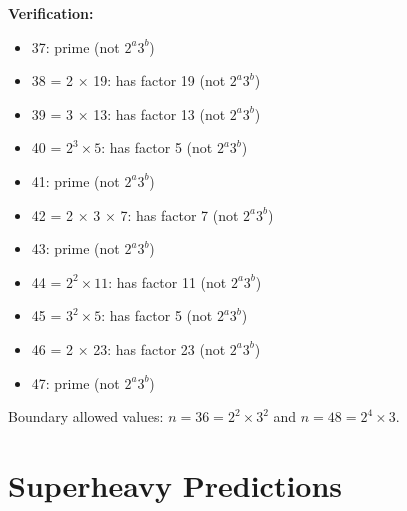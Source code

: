 \textbf{Verification:}
\begin{itemize}
    \item 37: prime (not $2^a 3^b$)
    \item 38 = 2 × 19: has factor 19 (not $2^a 3^b$)
    \item 39 = 3 × 13: has factor 13 (not $2^a 3^b$)
    \item 40 = $2^3 \times 5$: has factor 5 (not $2^a 3^b$)
    \item 41: prime (not $2^a 3^b$)
    \item 42 = 2 × 3 × 7: has factor 7 (not $2^a 3^b$)
    \item 43: prime (not $2^a 3^b$)
    \item 44 = $2^2 \times 11$: has factor 11 (not $2^a 3^b$)
    \item 45 = $3^2 \times 5$: has factor 5 (not $2^a 3^b$)
    \item 46 = 2 × 23: has factor 23 (not $2^a 3^b$)
    \item 47: prime (not $2^a 3^b$)
\end{itemize}

Boundary allowed values: $n = 36 = 2^2 \times 3^2$ and $n = 48 = 2^4 \times 3$.

\section{Superheavy Predictions}
\label{sec:tables:superheavy}

